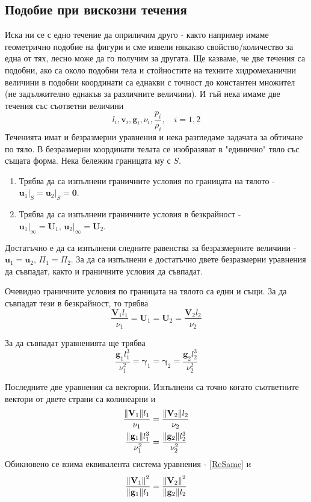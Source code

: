 \subsection{Подобие при вискозни течения}
Иска ни се с едно течение да оприличим друго - както например имаме геометрично подобие на фигури и сме извели някакво свойство/количество за една от тях, лесно може да го получим за другата.
Ще казваме, че две течения са подобни, ако са около подобни тела и стойностите на техните хидромеханични величини в подобни координати са еднакви с точност до константен множител (не задължително еднакъв за различните величини). 
И тъй нека имаме две течения със съответни величини 
\begin{equation}
	l_i, \mathbf{v}_i, \mathbf{g}_i, \nu_i, \frac{p_i}{\rho_i}, \quad i=1,2
\end{equation}
Теченията имат и безразмерни уравнения и нека разгледаме задачата за обтичане по тяло. 
В безразмерни координати телата се изобразяват в "единично" тяло със същата форма.
Нека бележим границата му с $S$. 
\begin{enumerate}
	\item Трябва да са изпълнени граничните условия по границата на тялото - $\mathbf{u}_1\vert_S = \mathbf{u}_2\vert_S = \mathbf{0}$.
	\item Трябва да са изпълнени граничните условия в безкрайност - $\mathbf{u}_1\vert_\infty = \mathbf{U}_1,\, \mathbf{u}_2\vert_\infty = \mathbf{U}_2$.
\end{enumerate}
Достатъчно е да са изпълнени следните равенства за безразмерните величини - $\mathbf{u}_1 = \mathbf{u}_2,\, \Pi_1 = \Pi_2$.
За да са изпълнени е достатъчно двете безразмерни уравнения да съвпадат, както и граничните условия да съвпадат.

Очевидно граничните условия по границата на тялото са едни и същи.
За да съвпадат тези в безкрайност, то трябва
\begin{equation}
	\frac{\mathbf{V}_1 l_1}{\nu_1} = \mathbf{U}_1 = \mathbf{U}_2 = \frac{\mathbf{V}_2 l_2}{\nu_2}
\end{equation}

За да съвпадат уравненията ще трябва
\begin{equation}
	\frac{\mathbf{g}_1 l_1^3}{\nu_1^2} = \bm{\gamma}_1 = \bm{\gamma}_2 = \frac{\mathbf{g}_2 l_2^3}{\nu_2^2}
\end{equation}

Последните две уравнения са векторни. Изпълнени са точно когато съответните вектори от двете страни са колинеарни и
\begin{gather}
	\label{ReSame} \frac{\norm{\mathbf{V}_1} l_1}{\nu_1} = \frac{\norm{\mathbf{V}_2} l_2}{\nu_2}\\
	\frac{\norm{\mathbf{g}_1} l_1^3}{\nu_1^2} = \frac{\norm{\mathbf{g}_2} l_2^3}{\nu_2^2}
\end{gather}
Обикновено се взима еквивалента система уравнения - \eqref{ReSame} и 
\begin{equation}
	\label{FrSame} \frac{\norm{\mathbf{V}_1}^2}{\norm{\mathbf{g}_1} l_1} = \frac{\norm{\mathbf{V}_2}^2}{\norm{\mathbf{g}_2} l_2}
\end{equation}

